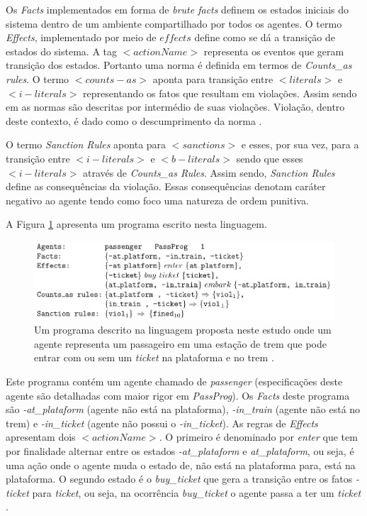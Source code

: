 Os \textit{Facts} implementados em forma de \textit{brute facts} definem os estados iniciais do sistema dentro de um ambiente compartilhado por todos os agentes. O termo \textit{Effects}, implementado por meio de $effects$ define como se dá a transição de estados do sistema. A tag $<actionName>$ representa os eventos que geram transição dos estados. Portanto uma norma é definida em termos de \textit{Counts\_as rules}. O termo $<counts-as>$ aponta para transição entre $<literals>$ e $<i-literals>$ representando os fatos que resultam em violações. Assim sendo em \cite{dastaniframework} as normas são descritas por intermédio de suas violações. Violação, dentro deste contexto, é dado como o descumprimento da norma \cite{ontologynormative}.

O termo \textit{Sanction Rules} aponta para $<sanctions>$ e esses, por sua vez, para a transição entre $<i-literals>$ e $<b-literals>$ sendo que esses $<i-literals>$ através de \textit{Counts\_as Rules}. Assim sendo, \textit{Sanction Rules} define as consequências da violação. Essas consequências denotam caráter negativo ao agente tendo como foco uma natureza de ordem punitiva.

A Figura \ref{exemploprograma} apresenta um programa escrito nesta linguagem. 

\begin{figure}[H]
  \centering
  \includegraphics[width=0.8\linewidth]{figure/programdastani.png} 
  \caption{Um programa descrito na linguagem proposta neste estudo onde um agente representa um passageiro em uma estação de trem que pode entrar com ou sem um \textit{ticket} na plataforma e no trem \cite{dastaniframework}.}
  \label{exemploprograma}
\end{figure}

Este programa contém um agente chamado de \textit{passenger} (especificações deste agente são detalhadas com maior rigor em \textit{PassProg}). Os \textit{Facts} deste programa são \textit{-at\_plataform} (agente não está na plataforma), \textit{-in\_train} (agente não está no trem) e \textit{-in\_ticket} (agente não possui o \textit{-in\_ticket}). As regras de \textit{Effects} apresentam dois $<actionName>$. O primeiro é denominado por \textit{enter} que tem por finalidade alternar entre os estados \textit{-at\_plataform} e \textit{at\_plataform}, 
ou seja, é uma ação onde o agente muda o estado de, não está na plataforma para, está na plataforma. O segundo estado é o \textit{buy\_ticket} que gera a transição entre os fatos \textit{-ticket} para \textit{ticket}, ou seja, na ocorrência \textit{buy\_ticket} o agente passa a ter um \textit{ticket} \cite{dastaniframework}.


